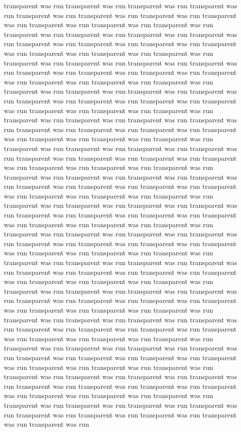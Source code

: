 transparent was run
transparent was run
transparent was run
transparent was run
transparent was run
transparent was run
transparent was run
transparent was run
transparent was run
transparent was run
transparent was run
transparent was run
transparent was run
transparent was run
transparent was run
transparent was run
transparent was run
transparent was run
transparent was run
transparent was run
transparent was run
transparent was run
transparent was run
transparent was run
transparent was run
transparent was run
transparent was run
transparent was run
transparent was run
transparent was run
transparent was run
transparent was run
transparent was run
transparent was run
transparent was run
transparent was run
transparent was run
transparent was run
transparent was run
transparent was run
transparent was run
transparent was run
transparent was run
transparent was run
transparent was run
transparent was run
transparent was run
transparent was run
transparent was run
transparent was run
transparent was run
transparent was run
transparent was run
transparent was run
transparent was run
transparent was run
transparent was run
transparent was run
transparent was run
transparent was run
transparent was run
transparent was run
transparent was run
transparent was run
transparent was run
transparent was run
transparent was run
transparent was run
transparent was run
transparent was run
transparent was run
transparent was run
transparent was run
transparent was run
transparent was run
transparent was run
transparent was run
transparent was run
transparent was run
transparent was run
transparent was run
transparent was run
transparent was run
transparent was run
transparent was run
transparent was run
transparent was run
transparent was run
transparent was run
transparent was run
transparent was run
transparent was run
transparent was run
transparent was run
transparent was run
transparent was run
transparent was run
transparent was run
transparent was run
transparent was run
transparent was run
transparent was run
transparent was run
transparent was run
transparent was run
transparent was run
transparent was run
transparent was run
transparent was run
transparent was run
transparent was run
transparent was run
transparent was run
transparent was run
transparent was run
transparent was run
transparent was run
transparent was run
transparent was run
transparent was run
transparent was run
transparent was run
transparent was run
transparent was run
transparent was run
transparent was run
transparent was run
transparent was run
transparent was run
transparent was run
transparent was run
transparent was run
transparent was run
transparent was run
transparent was run
transparent was run
transparent was run
transparent was run
transparent was run
transparent was run
transparent was run
transparent was run
transparent was run
transparent was run
transparent was run
transparent was run
transparent was run
transparent was run
transparent was run
transparent was run
transparent was run
transparent was run
transparent was run
transparent was run
transparent was run
transparent was run
transparent was run
transparent was run
transparent was run
transparent was run
transparent was run
transparent was run
transparent was run

